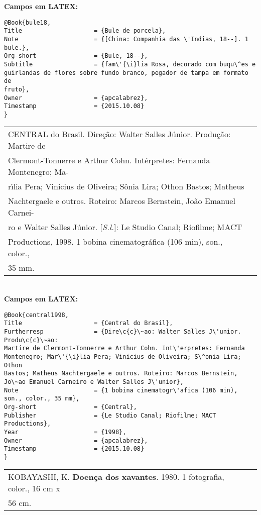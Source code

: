 \textbf{Campos em LATEX:} 

\begin{verbatim}
@Book{bule18,
Title                    = {Bule de porcela},
Note                     = {[China: Companhia das \'Indias, 18--]. 1 
bule.}, 
Org-short                = {Bule, 18--},
Subtitle                 = {fam\'{\i}lia Rosa, decorado com buqu\^es e 
guirlandas de flores sobre fundo branco, pegador de tampa em formato de 
fruto},
Owner                    = {apcalabrez},
Timestamp                = {2015.10.08}
}
\end{verbatim}

\begin{tabular}{|l|c|} \hline
	CENTRAL do Brasil. Dire\c{c}\~ao: Walter Salles J\'unior. Produ\c{c}\~ao: Martire de\\
	Clermont-Tonnerre e Arthur Cohn. Int\'erpretes: Fernanda Montenegro; Ma-\\
	r\'{\i}lia Pera; Vinicius de Oliveira; S\^onia Lira; Othon Bastos; Matheus\\ 
	Nachtergaele e outros. Roteiro: Marcos Bernstein, Jo\~ao Emanuel Carnei-\\
	ro e Walter Salles J\'unior. [\textit{S.l.}]: Le Studio Canal; Riofilme; MACT \\
	Productions, 1998. 1 bobina cinematogr\'afica (106 min), son., color., 
	\\35 mm. 
	\\\hline
\end{tabular} \\

\textbf{Campos em LATEX:} 

\begin{verbatim}
@Book{central1998,
Title                    = {Central do Brasil},
Furtherresp              = {Dire\c{c}\~ao: Walter Salles J\'unior. Produ\c{c}\~ao: 
Martire de Clermont-Tonnerre e Arthur Cohn. Int\'erpretes: Fernanda 
Montenegro; Mar\'{\i}lia Pera; Vinicius de Oliveira; S\^onia Lira; Othon 
Bastos; Matheus Nachtergaele e outros. Roteiro: Marcos Bernstein, 
Jo\~ao Emanuel Carneiro e Walter Salles J\'unior},
Note                     = {1 bobina cinematogr\'afica (106 min), 
son., color., 35 mm},
Org-short                = {Central},
Publisher                = {Le Studio Canal; Riofilme; MACT 
Productions},
Year                     = {1998},
Owner                    = {apcalabrez},
Timestamp                = {2015.10.08}
}
\end{verbatim}

\begin{tabular}{|l|c|} \hline
	KOBAYASHI, K. \textbf{Doen\c{c}a dos xavantes}. 1980. 1 fotografia, color., 16 cm x \\
	56 cm. 
	\\\hline
\end{tabular} \\

